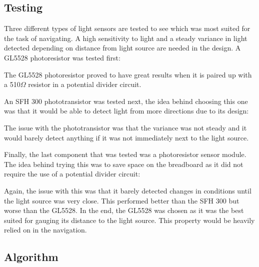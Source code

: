 \subsection{Testing}

Three different types of light sensors are tested to see which was most suited for the task of navigating. A high sensitivity to light and a steady variance in light detected depending on distance from light source are needed in the design. A GL5528 photoresistor was tested first:


The GL5528 photoresistor proved to have great results when it is paired up with a 510\(\Omega\) resistor in a potential divider circuit.

An SFH 300 phototransistor was tested next, the idea behind choosing this one was that it would be able to detect light from more directions due to its design:


The issue with the phototransistor was that the variance was not steady and it would barely detect anything if it was not immediately next to the light source.

Finally, the last component that was tested was a photoresistor sensor module. The idea behind trying this was to save space on the breadboard as it did not require the use of a potential divider circuit:


Again, the issue with this was that it barely detected changes in conditions until the light source was very close. This performed better than the SFH 300 but worse than the GL5528. In the end, the GL5528 was chosen as it was the best suited for gauging its distance to the light source. This property would be heavily relied on in the navigation.

\subsection{Algorithm}

